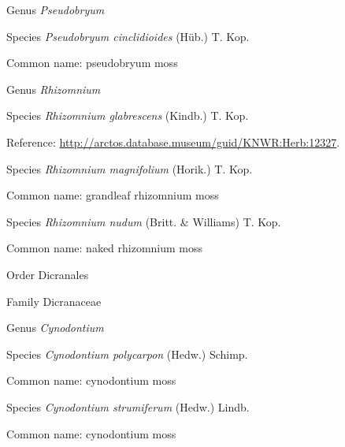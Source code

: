 \documentclass[9pt, article]{memoir}
\begin{document}
\begin{multicols}{2}
\vspace{6pt}\noindent\hspace{30pt}Genus \textit{Pseudobryum}


\vspace{6pt}\noindent\hspace{36pt}Species \textit{Pseudobryum cinclidioides} (Hüb.) T. Kop.


Common name: pseudobryum moss

\vspace{6pt}\noindent\hspace{30pt}Genus \textit{Rhizomnium}


\vspace{6pt}\noindent\hspace{36pt}Species \textit{Rhizomnium glabrescens} (Kindb.) T. Kop.


Reference: 
\url{http://arctos.database.museum/guid/KNWR:Herb:12327}.

\vspace{6pt}\noindent\hspace{36pt}Species \textit{Rhizomnium magnifolium} (Horik.) T. Kop.


Common name: grandleaf rhizomnium moss

\vspace{6pt}\noindent\hspace{36pt}Species \textit{Rhizomnium nudum} (Britt. \& Williams) T. Kop.


Common name: naked rhizomnium moss

\vspace{6pt}\noindent\hspace{18pt}Order Dicranales


\vspace{6pt}\noindent\hspace{24pt}Family Dicranaceae


\vspace{6pt}\noindent\hspace{30pt}Genus \textit{Cynodontium}


\vspace{6pt}\noindent\hspace{36pt}Species \textit{Cynodontium polycarpon} (Hedw.) Schimp.


Common name: cynodontium moss

\vspace{6pt}\noindent\hspace{36pt}Species \textit{Cynodontium strumiferum} (Hedw.) Lindb.


Common name: cynodontium moss


\end{multicols}
\end{document}
